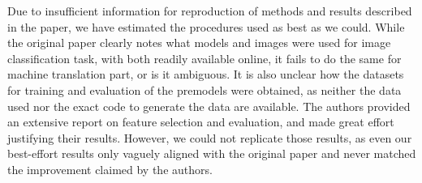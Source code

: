 Due to insufficient information for reproduction of methods and results described in the paper, we have estimated the procedures used as best as we could. While the original paper clearly notes what models and images were used for image classification task, with both readily available online, it fails to do the same for machine translation part, 
or is it ambiguous. It is also unclear how the datasets for training and evaluation of the premodels were obtained, as neither the data used nor the exact code to generate the data are available. The authors provided an extensive report on feature selection and evaluation, and made great effort justifying their results. 
However, we could not replicate those results, as even our best-effort results only vaguely aligned with the original paper and never matched the improvement claimed by the authors.


